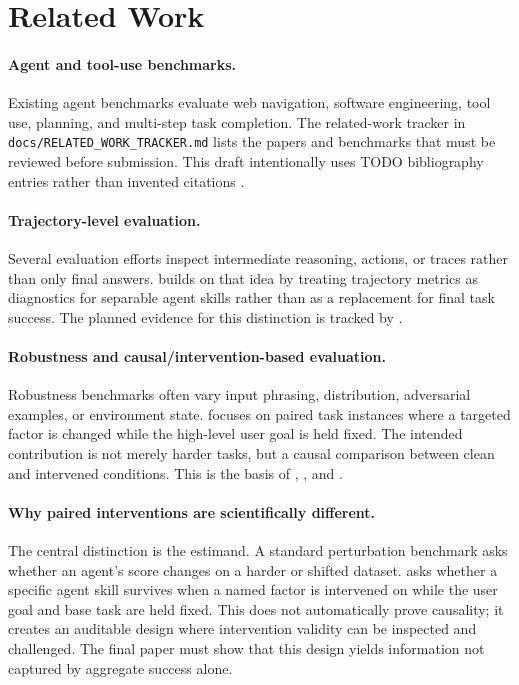 \section{Related Work}

\paragraph{Agent and tool-use benchmarks.}
Existing agent benchmarks evaluate web navigation, software engineering, tool use, planning, and multi-step task completion. The related-work tracker in \texttt{docs/RELATED\_WORK\_TRACKER.md} lists the papers and benchmarks that must be reviewed before submission. This draft intentionally uses TODO bibliography entries rather than invented citations \citep{todo_agent_benchmark_survey,todo_tool_use_benchmarks,todo_web_navigation_benchmarks,todo_software_agent_benchmarks}.

\paragraph{Trajectory-level evaluation.}
Several evaluation efforts inspect intermediate reasoning, actions, or traces rather than only final answers. \benchmark builds on that idea by treating trajectory metrics as diagnostics for separable agent skills rather than as a replacement for final task success. The planned evidence for this distinction is tracked by .

\paragraph{Robustness and causal/intervention-based evaluation.}
Robustness benchmarks often vary input phrasing, distribution, adversarial examples, or environment state. \benchmark focuses on paired task instances where a targeted factor is changed while the high-level user goal is held fixed. The intended contribution is not merely harder tasks, but a causal comparison between clean and intervened conditions. This is the basis of , , and .

\paragraph{Why paired interventions are scientifically different.}
The central distinction is the estimand. A standard perturbation benchmark asks whether an agent's score changes on a harder or shifted dataset. \benchmark asks whether a specific agent skill survives when a named factor is intervened on while the user goal and base task are held fixed. This does not automatically prove causality; it creates an auditable design where intervention validity can be inspected and challenged. The final paper must show that this design yields information not captured by aggregate success alone.

